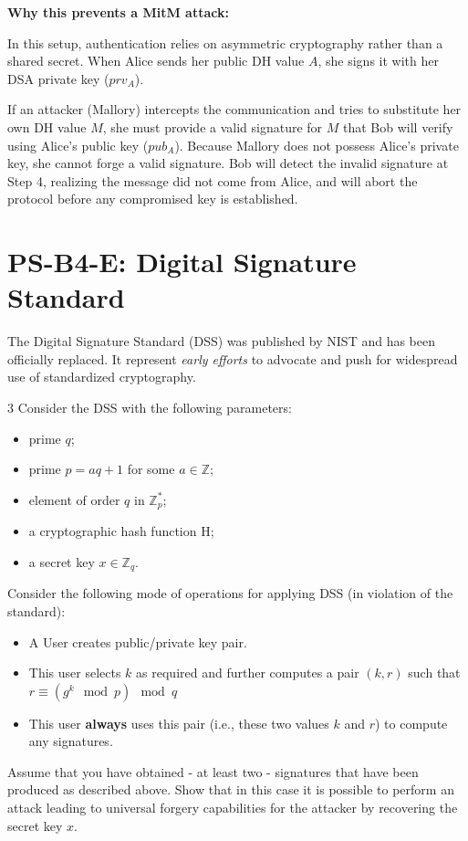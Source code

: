 \documentclass[]{scrartcl}
\newcommand{\ZZ}{\mathbb{Z}}
\newcounter{exercise}
\newcounter{qid}[section]
\newcommand{\exerciseprefix}{prefix}
\newcommand{\questiontitle}{Questions}
\newcommand{\blockid}{B4}
\newcommand{\exname}{}
\begin{document}
\textbf{Why this prevents a MitM attack:}

In this setup, authentication relies on asymmetric cryptography rather than a shared secret. When Alice sends her public DH value $A$, she signs it with her DSA private key ($prv_A$). 

If an attacker (Mallory) intercepts the communication and tries to substitute her own DH value $M$, she must provide a valid signature for $M$ that Bob will verify using Alice's public key ($pub_A$). Because Mallory does not possess Alice's private key, she cannot forge a valid signature. Bob will detect the invalid signature at Step 4, realizing the message did not come from Alice, and will abort the protocol before any compromised key is established.

\pagebreak
{}
\renewcommand{\exname}{DSS}
\section*{PS-\blockid{}-E\theexercise: Digital Signature Standard}
The Digital Signature Standard (DSS) was published by NIST and has been officially replaced. It represent \emph{early efforts} to advocate and push for widespread use of standardized cryptography. 

\renewcommand{\exerciseprefix}{PS-\blockid{}-E\theexercise: \exname{}-Q\theqid}
\renewcommand{\questiontitle}{\exerciseprefix{}: Attack on optimized operational use of DSS}
\begin{exercisebox}{3}
Consider the DSS with the following parameters:
\begin{itemize}
    \item prime $q$;
    \item prime $p = aq + 1$ for some $a \in \ZZ$;
    \item element of order $q$ in $\ZZ_{p}^{*}$;
    \item a cryptographic hash function H;
    \item a secret key $x \in \ZZ_{q}$.
\end{itemize}
Consider the following mode of operations for applying DSS (in violation of the standard):
\begin{itemize}
    \item A User creates public/private key pair. 
    \item This user selects $k$ as required and further computes a pair $(k,r)$ such that $r \equiv \left( g^{k} \mod p \right) \mod q $
    \item This user \textbf{always} uses this pair (i.e., these two values $k$ and $r$) to compute any signatures.  
\end{itemize}
Assume that you have obtained - at least two - signatures that have been produced as described above. Show that in this case it is possible to perform an attack leading to universal forgery capabilities for the attacker by recovering the secret key $x$.
\end{exercisebox}
\end{document}
